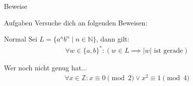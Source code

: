 %
%
%
%

{
\begin{frame}[fragile]{Beweise}
	\begin{alertblock}{Aufgaben}
		Versuche dich an folgenden Beweisen:
	\end{alertblock}
	\begin{block}{Normal}
		Sei $L = \{a^nb^n \mid n \in \mathbb{N}\}$, dann gilt:
		\begin{align*}
			\forall w \in \{a, b\}^*: \left(w \in L \implies |w| \text{ ist gerade}\right)
		\end{align*}
	\end{block}
	\begin{block}{Wer noch nicht genug hat...}
		\begin{align*}
			\forall x \in \mathbb{Z}: x \equiv 0 \pmod{2} \vee x^2 \equiv 1 \pmod{4}
		\end{align*}
	\end{block}
\end{frame}
}

